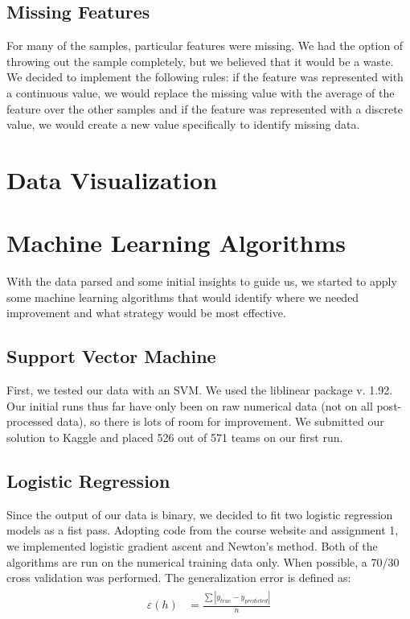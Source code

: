 \documentclass[paper=letter, fontsize=11pt]{scrartcl} %
\numberwithin{equation}{section} %
\begin{document}
\subsection{Missing Features}
	For many of the samples, particular features were missing. We had the option of throwing out the sample completely, but we believed that it would be a waste. We decided to implement the following rules: if the feature was represented with a continuous value, we would replace the missing value with the average of the feature over the other samples and if the feature was represented with a discrete value, we would create a new value specifically to identify missing data.

\section{Data Visualization}

\begin{comment}
\begin{figure}[!ht]
  \centering
	\includegraphics[width=0.8\columnwidth]
		{figures/dielectriconfabricdimension.pdf}
	\caption{.}
\end{figure}
\end{comment}

\section{Machine Learning Algorithms}
	With the data parsed and some initial insights to guide us, we started to apply some machine learning algorithms that would identify where we needed improvement and what strategy would be most effective.

\subsection{Support Vector Machine}
	First, we tested our data with an SVM. We used the liblinear package v. 1.92. Our initial runs thus far have only been on raw numerical data (not on all post-processed data), so there is lots of room for improvement. We submitted our solution to Kaggle and placed 526 out of 571 teams on our first run.

\subsection{Logistic Regression}
	Since the output of our data is binary, we decided to fit two logistic regression models as a fist pass. Adopting code from the course website and assignment 1, we implemented logistic gradient ascent and Newton's method. Both of the algorithms are run on the numerical training data only. When possible, a 70/30 cross validation was performed. The generalization error is defined as:
\begin{align} 
\begin{split}
\varepsilon(h) &= \frac{\sum|y_{true} - y_{predicted}|}{n} \\
\end{split}					
\end{align}
\end{document}
